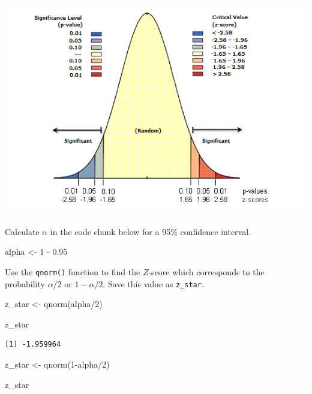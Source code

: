 \documentclass[
  letterpaper,
  DIV=11,
  numbers=noendperiod]{scrartcl}
\newenvironment{Shaded}{\begin{snugshade}}{\end{snugshade}}
\newcommand{\DecValTok}[1]{\textcolor[rgb]{0.68,0.00,0.00}{#1}}
\newcommand{\FloatTok}[1]{\textcolor[rgb]{0.68,0.00,0.00}{#1}}
\newcommand{\FunctionTok}[1]{\textcolor[rgb]{0.28,0.35,0.67}{#1}}
\newcommand{\NormalTok}[1]{\textcolor[rgb]{0.00,0.23,0.31}{#1}}
\newcommand{\OtherTok}[1]{\textcolor[rgb]{0.00,0.23,0.31}{#1}}
\newcommand{\SpecialCharTok}[1]{\textcolor[rgb]{0.37,0.37,0.37}{#1}}
\begin{document}
\includegraphics{homework4_answer_key_files/mediabag/z-scores.png}

Calculate \(\alpha\) in the code chunk below for a 95\% confidence
interval.

\begin{Shaded}
\begin{Highlighting}[]
\NormalTok{alpha }\OtherTok{\textless{}{-}} \DecValTok{1} \SpecialCharTok{{-}} \FloatTok{0.95}
\end{Highlighting}
\end{Shaded}

Use the \texttt{qnorm()} function to find the \(Z\)-score which
corresponds to the probability \(\alpha/2\) or \(1-\alpha/2\). Save this
value as \texttt{z\_star}.

\begin{Shaded}
\begin{Highlighting}[]
\NormalTok{z\_star }\OtherTok{\textless{}{-}} \FunctionTok{qnorm}\NormalTok{(alpha}\SpecialCharTok{/}\DecValTok{2}\NormalTok{)}

\NormalTok{z\_star}
\end{Highlighting}
\end{Shaded}

\begin{verbatim}
[1] -1.959964
\end{verbatim}

\begin{Shaded}
\begin{Highlighting}[]
\NormalTok{z\_star }\OtherTok{\textless{}{-}} \FunctionTok{qnorm}\NormalTok{(}\DecValTok{1}\SpecialCharTok{{-}}\NormalTok{alpha}\SpecialCharTok{/}\DecValTok{2}\NormalTok{)}

\NormalTok{z\_star}
\end{Highlighting}
\end{Shaded}
\end{document}
